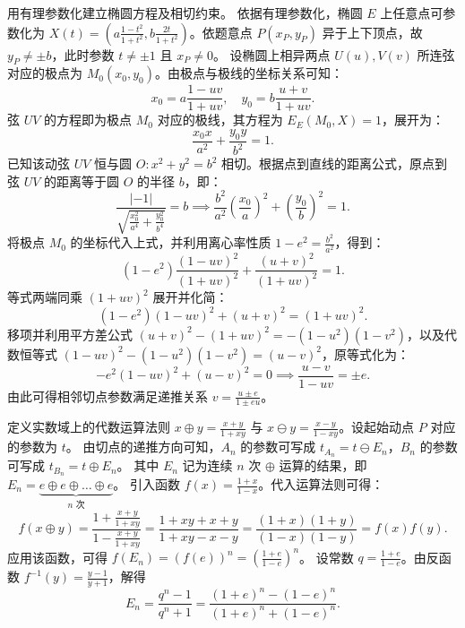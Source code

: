 \begin{solution}
用有理参数化建立椭圆方程及相切约束。
依据有理参数化，椭圆 $E$ 上任意点可参数化为 $X(t) = \left( a\frac{1-t^2}{1+t^2}, b\frac{2t}{1+t^2} \right)$。依题意点 $P(x_P, y_P)$ 异于上下顶点，故 $y_P \neq \pm b$，此时参数 $t \neq \pm 1$ 且 $x_P \neq 0$。
设椭圆上相异两点 $U(u), V(v)$ 所连弦对应的极点为 $M_0(x_0, y_0)$。由极点与极线的坐标关系可知：
\[ x_0 = a\frac{1-uv}{1+uv}, \quad y_0 = b\frac{u+v}{1+uv}. \]
弦 $UV$ 的方程即为极点 $M_0$ 对应的极线，其方程为 $E_E(M_0, X) = 1$，展开为：
\[ \frac{x_0 x}{a^2} + \frac{y_0 y}{b^2} = 1. \]
已知该动弦 $UV$ 恒与圆 $O: x^2 + y^2 = b^2$ 相切。根据点到直线的距离公式，原点到弦 $UV$ 的距离等于圆 $O$ 的半径 $b$，即：
\[ \frac{|-1|}{\sqrt{\frac{x_0^2}{a^4} + \frac{y_0^2}{b^4}}} = b \implies \frac{b^2}{a^2} \left(\frac{x_0}{a}\right)^2 + \left(\frac{y_0}{b}\right)^2 = 1. \]
将极点 $M_0$ 的坐标代入上式，并利用离心率性质 $1-e^2 = \frac{b^2}{a^2}$，得到：
\[ (1-e^2)\frac{(1-u v)^2}{(1+u v)^2} + \frac{(u+v)^2}{(1+u v)^2} = 1. \]
等式两端同乘 $(1+u v)^2$ 展开并化简：
\[ (1-e^2)(1-u v)^2 + (u+v)^2 = (1+u v)^2. \]
移项并利用平方差公式 $(u+v)^2 - (1+u v)^2 = -(1-u^2)(1-v^2)$，以及代数恒等式 $(1-u v)^2 - (1-u^2)(1-v^2) = (u-v)^2$，原等式化为：
\[ -e^2(1-u v)^2 + (u-v)^2 = 0 \implies \frac{u - v}{1 - u v} = \pm e. \]
由此可得相邻切点参数满足递推关系 $v = \frac{u \pm e}{1 \pm e u}$。

定义实数域上的代数运算法则 $x \oplus y = \frac{x+y}{1+xy}$ 与 $x \ominus y = \frac{x-y}{1-xy}$。设起始动点 $P$ 对应的参数为 $t$。
由切点的递推方向可知，$A_n$ 的参数可写成 $t_{A_n} = t \ominus E_n$，$B_n$ 的参数可写成 $t_{B_n} = t \oplus E_n$。
其中 $E_n$ 记为连续 $n$ 次 $\oplus$ 运算的结果，即 $E_n = \underbrace{e \oplus e \oplus \dots \oplus e}_{n \text{ 次}}$。
引入函数 $f(x) = \frac{1+x}{1-x}$。代入运算法则可得：
\[ f(x \oplus y) = \frac{1 + \frac{x+y}{1+xy}}{1 - \frac{x+y}{1+xy}} = \frac{1+xy+x+y}{1+xy-x-y} = \frac{(1+x)(1+y)}{(1-x)(1-y)} = f(x)f(y). \]
应用该函数，可得 $f(E_n) = (f(e))^n = \left(\frac{1+e}{1-e}\right)^n$。
设常数 $q = \frac{1+e}{1-e}$。由反函数 $f^{-1}(y) = \frac{y-1}{y+1}$，解得
\[ E_n = \frac{ q^n - 1 }{ q^n + 1 } = \frac{(1+e)^n - (1-e)^n}{(1+e)^n + (1-e)^n}. \]


\end{solution}
